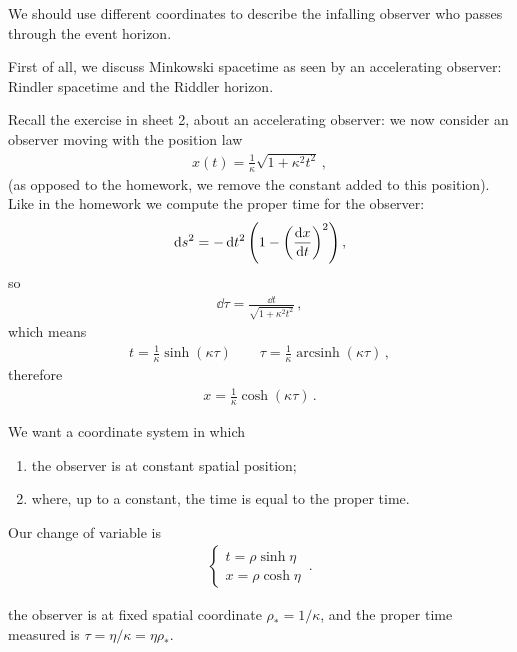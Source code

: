 \documentclass[main.tex]{subfiles}
\begin{document}
We should use different coordinates to describe the infalling observer who passes through the event horizon. 

First of all, we discuss Minkowski spacetime as seen by an accelerating observer: Rindler spacetime and the Riddler horizon. 

Recall the exercise in sheet 2, about an accelerating observer: we now consider an observer moving with the position law 
%
\begin{align}
  x(t) = \frac{1}{\kappa } \sqrt{1 + \kappa^2t^2}
\,,
\end{align}
%
(as opposed to the homework, we remove the constant added to this position).
Like in the homework we compute the proper time for the observer: 
%
\begin{align}
  \dd{s^2} = - \dd{t^2} \qty(1 - \qty(\dv{x}{t})^2)
\,,
\end{align}
%
so 
%
\begin{align}
  \dd{\tau} = \frac{ \dd{t}}{\sqrt{1 + \kappa^2t^2}}
\,,
\end{align}
%
which means 
%
\begin{align}
t = \frac{1}{\kappa } \operatorname{sinh} (\kappa \tau )
    \qquad 
\tau  = \frac{1}{\kappa } \operatorname{arcsinh} (\kappa \tau )
\,,
\end{align}
%
therefore 
%
\begin{align}
  x = \frac{1}{\kappa } \cosh(\kappa \tau )
\,.
\end{align}
%

We want a coordinate system in which 
\begin{enumerate}
    \item the observer is at constant spatial position;
    \item where, up to a constant, the time is equal to the proper time.
\end{enumerate}

Our change of variable is 
%
\begin{subequations}
\begin{align}
  \begin{cases}
      t = \rho \sinh \eta  \\
      x = \rho \cosh \eta 
  \end{cases}
\,.
\end{align}
\end{subequations}
%

the observer is at fixed spatial coordinate \(\rho_{*} = 1 / \kappa \), and the proper time measured is \(\tau = \eta / \kappa = \eta \rho_{*}\). 
\end{document}

